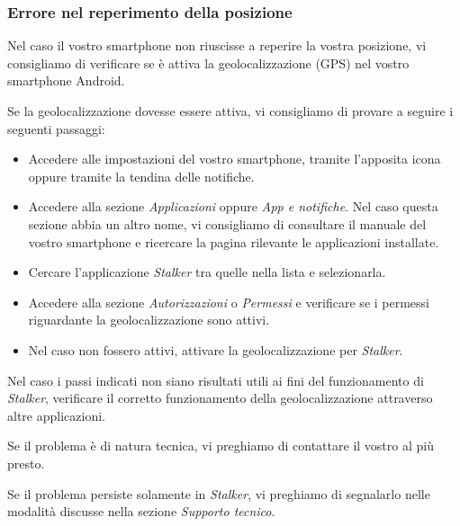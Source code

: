 \documentclass[../manuale-utente.tex]{subfiles}
\begin{document}
\subsubsection{Errore nel reperimento della posizione}%
\label{subs:mobile_app_errore_posizione}

Nel caso il vostro smartphone non riuscisse a reperire la vostra posizione, vi consigliamo di verificare se è attiva la geolocalizzazione (GPS) nel vostro smartphone Android.

Se la geolocalizzazione dovesse essere attiva, vi consigliamo di provare a seguire i seguenti passaggi:
\begin{itemize}
    \item Accedere alle impostazioni del vostro smartphone, tramite l'apposita icona oppure tramite la tendina delle notifiche.
    \item Accedere alla sezione \textit{Applicazioni} oppure \textit{App e notifiche}. Nel caso questa sezione abbia un altro nome, vi consigliamo di consultare il manuale del vostro smartphone e ricercare la pagina rilevante le applicazioni installate.
    \item Cercare l'applicazione \textit{Stalker} tra quelle nella lista e selezionarla.
    \item Accedere alla sezione \textit{Autorizzazioni} o \textit{Permessi} e verificare se i permessi riguardante la geolocalizzazione sono attivi.
    \item Nel caso non fossero attivi, attivare la geolocalizzazione per \textit{Stalker}.
\end{itemize}

Nel caso i passi indicati non siano risultati utili ai fini del funzionamento di \textit{Stalker}, verificare il corretto funzionamento della geolocalizzazione attraverso altre applicazioni.

Se il problema è di natura tecnica, vi preghiamo di contattare il vostro  al più presto.

Se il problema persiste solamente in \textit{Stalker}, vi preghiamo di segnalarlo nelle modalità discusse nella sezione \textit{Supporto tecnico}.
\end{document}
